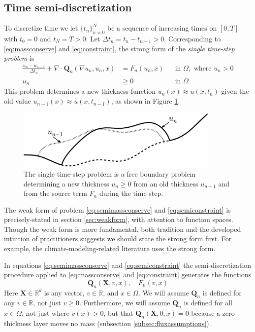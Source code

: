 \documentclass[final,leqno,onefignum,onetabnum]{siamltex1213bueler}
\newcommand\bQ{\mathbf{Q}}
\newcommand\bX{\mathbf{X}}
\newcommand{\Div}{\nabla\cdot}
\renewcommand{\grad}{\nabla}
\newcommand\RR{\mathbb{R}}
\begin{document}
\subsection{Time semi-discretization}  \label{subsec:strongsingle}  To discretize time we let $\{t_n\}_{n=0}^N$ be a sequence of increasing times on $[0,T]$ with $t_0=0$ and $t_N=T>0$.  Let $\Delta t_n = t_n-t_{n-1}>0$.  Corresponding to \eqref{eq:massconserve} and \eqref{eq:constraint}, the strong form of the \emph{single time-step problem} is
\begin{align}
\frac{u_n - u_{n-1}}{\Delta t_n} + \Div \bQ_n(\grad u_n,u_n,x) &= F_n(u_n,x) &&\text{in } \Omega, \text{ where } u_n > 0 \label{eq:semimassconserve} \\
u_n &\ge 0 &&\text{in } \overline{\Omega} \label{eq:semiconstraint}
\end{align}
This problem determines a new thickness function $u_n(x) \approx u(x,t_n)$ given the old value $u_{n-1}(x) \approx u(x,t_{n-1})$, as shown in Figure \ref{fig:timestepcartoon}.

\begin{figure}[ht]
\begin{center}
\includegraphics[width=3.9in,keepaspectratio=true]{time-step-cartoon}
\end{center}
\caption{The single time-step problem is a free boundary problem determining a new thickness $u_n\ge 0$ from an old thickness $u_{n-1}$ and from the source term $F_n$ during the time step.}
\label{fig:timestepcartoon}
\end{figure}

The weak form of problem \eqref{eq:semimassconserve} and \eqref{eq:semiconstraint} is precisely-stated in section \ref{sec:weakform}, with attention to function spaces.  Though the weak form is more fundamental, both tradition and the developed intuition of practitioners suggests we should state the strong form first.  For example, the climate-modeling-related literature uses the strong form.

In equations \eqref{eq:semimassconserve} and \eqref{eq:semiconstraint} the semi-discretization procedure applied to \eqref{eq:massconserve} and \eqref{eq:constraint} generates the functions
\begin{equation}
\bQ_n(\bX,v,x), \quad F_n(v,x) \label{eq:functionalforms}
\end{equation}
Here $\bX\in\RR^d$ is any vector, $v\in\RR$, and $x\in \Omega$.  We will assume $\bQ_n$ is defined for any $v\in\RR$, not just $v\ge 0$.  Furthermore, we will assume $\bQ_n$ is defined for all $x\in\Omega$, not just where $v(x)>0$, but that $\bQ_n(\bX,0,x)=0$ because a zero-thickness layer moves no mass (subsection \ref{subsec:fluxassumptions}).
\end{document}
